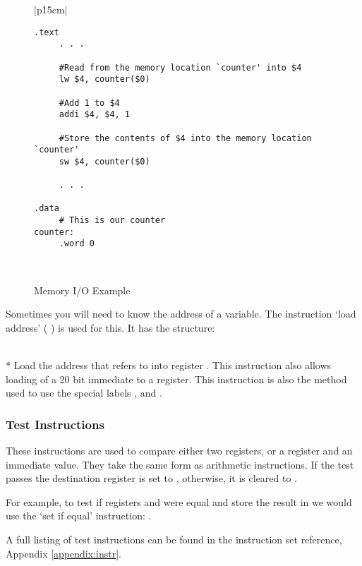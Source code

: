 \begin{figure}[btp]
\begin{center}
\begin{tabular}{|p{15cm}|}
\hline
\begin{verbatim}
.text
     . . .

     #Read from the memory location `counter' into $4
     lw $4, counter($0)

     #Add 1 to $4
     addi $4, $4, 1

     #Store the contents of $4 into the memory location `counter'
     sw $4, counter($0)

     . . .
     
.data
     # This is our counter
counter:
     .word 0 
\end{verbatim}%
\\
\hline
\end{tabular}
\end{center}
\caption{Memory I/O Example}
\label{memio}
\end{figure}

Sometimes you will need to know the address of a variable. The 
instruction `load address' (  ) is used for this. It has the 
structure:

 \\*
Load the address that  refers to into register \regd.
This instruction also allows loading of a 20 bit immediate to a register.
This instruction is also the method used to use the special labels 
,  and .

\subsubsection{Test Instructions}
These instructions are used to compare either two registers, or a
register and an immediate value. They take the same form as
arithmetic instructions. If the test passes the destination register
is set to , otherwise, it is cleared to .

For example, to test if registers  and  were equal and store the
result in  we would use the `set if equal' instruction: 
.

A full listing of test instructions can be found in the instruction set reference, Appendix \ref{appendix:instr}.

